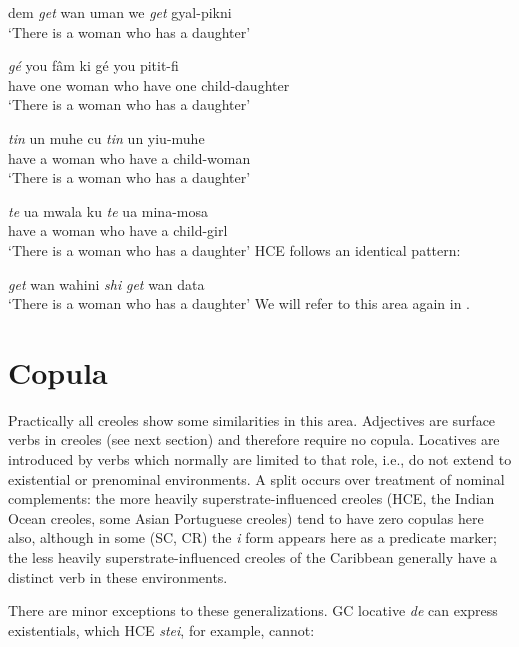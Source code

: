 \ea\label{ex:2:55}
 dem \textit{get} wan uman we \textit{get} gyal-pikni \\
\glt `There is a woman who has a daughter'
\z

\ea\label{ex:2:56}
\gll \emph{gé} you f{\^a}m ki gé you pitit-fi\\
have one woman who have one child-daughter\\
\glt `There is a woman who has a daughter'
\z

\ea\label{ex:2:57}
\gll \emph{tin} un muhe cu \emph{tin} un yiu-muhe\\
have a woman who have a child-woman \\
\glt `There is a woman who has a daughter'
\z

\ea\label{ex:2:58}
 \gll \emph{te} ua mwala ku \emph{te} ua mina-mosa \\
have a woman who have a child-girl\\
\glt `There is a woman who has a daughter'
\z
HCE follows an identical pattern:

\ea\label{ex:2:59}
 \textit{get} wan wahini \textit{shi} \textit{get} wan data\\
\glt `There is a woman who has a daughter' 
\z
We will refer to this area again in .

\section{Copula}

Practically all creoles show some similarities in this area. Adjec\-tives are surface verbs in creoles (see next section) and therefore require no copula. Locatives are introduced by verbs which normally are limited to that role, i.e., do not extend to existential or prenominal environments. A split occurs over treatment of nominal complements: the more heavily superstrate-influenced creoles (HCE, the Indian Ocean creoles, some Asian Portuguese creoles) tend to have zero copulas here also, although in some (SC, CR) the \textit{i} form appears here as a predicate marker; the less heavily superstrate-influenced creoles of the Caribbean generally have a distinct verb in these environments.

There are minor exceptions to these generalizations. GC locative \textit{de} can express existentials, which HCE \textit{stei}, for example, cannot:

\z

